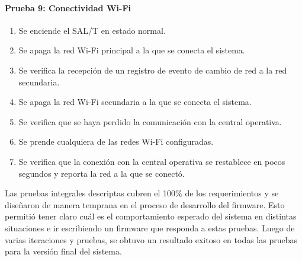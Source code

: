 \paragraph{Prueba 9: Conectividad Wi-Fi}
\begin{enumerate}
\item	Se enciende el SAL/T en estado normal.
\item	Se apaga la red Wi-Fi principal a la que se conecta el sistema.
\item	Se verifica la recepción de un registro de evento de cambio de red a la red secundaria.
\item	Se apaga la red Wi-Fi secundaria a la que se conecta el sistema.
\item	Se verifica que se haya perdido la comunicación con la central operativa.
\item	Se prende cualquiera de las redes Wi-Fi configuradas.
\item	Se verifica que la conexión con la central operativa se restablece en pocos segundos y reporta la red a la que se conectó.

\end{enumerate}




Las pruebas integrales descriptas cubren el 100\% de los requerimientos y se diseñaron de manera temprana en el proceso de desarrollo del firmware. Esto permitió tener claro cuál es el comportamiento esperado del sistema en distintas situaciones e ir escribiendo un firmware que responda a estas pruebas. Luego de varias iteraciones y pruebas, se obtuvo un resultado exitoso en todas las pruebas para la versión final del sistema. 
